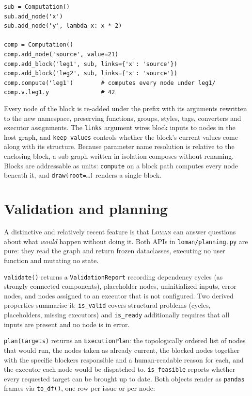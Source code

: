 \documentclass[11pt,a4paper]{article}
\newcommand{\loman}{\textsc{Loman}}
\newcommand{\code}[1]{\texttt{#1}}
\begin{document}
\begin{lstlisting}
sub = Computation()
sub.add_node('x')
sub.add_node('y', lambda x: x * 2)

comp = Computation()
comp.add_node('source', value=21)
comp.add_block('leg1', sub, links={'x': 'source'})
comp.add_block('leg2', sub, links={'x': 'source'})
comp.compute('leg1')        # computes every node under leg1/
comp.v.leg1.y               # 42
\end{lstlisting}

Every node of the block is re-added under the prefix with its arguments
rewritten to the new namespace, preserving functions, groups, styles, tags,
converters and executor assignments. The \code{links} argument wires block
inputs to nodes in the host graph, and \code{keep\_values} controls whether the
block's current values come along with its structure. Because parameter name
resolution is relative to the enclosing block, a sub-graph written in isolation
composes without renaming. Blocks are addressable as units: \code{compute} on a
block path computes every node beneath it, and \code{draw(root=\ldots)} renders
a single block.

\section{Validation and planning}\label{sec:plan}

A distinctive and relatively recent feature is that \loman{} can answer
questions about what \emph{would} happen without doing it. Both APIs in
\code{loman/planning.py} are pure: they read the graph and return frozen
dataclasses, executing no user function and mutating no state.

\code{validate()} returns a \code{ValidationReport} recording dependency cycles
(as strongly connected components), placeholder nodes, uninitialized inputs,
error nodes, and nodes assigned to an executor that is not configured. Two
derived properties summarise it: \code{is\_valid} covers structural problems
(cycles, placeholders, missing executors) and \code{is\_ready} additionally
requires that all inputs are present and no node is in error.

\code{plan(targets)} returns an \code{ExecutionPlan}: the topologically ordered
list of nodes that would run, the nodes taken as already current, the blocked
nodes together with the specific blockers responsible and a human-readable
reason for each, and the executor each node would be dispatched to.
\code{is\_feasible} reports whether every requested target can be brought up to
date. Both objects render as \code{pandas} frames via \code{to\_df()}, one row
per issue or per node:
\end{document}
